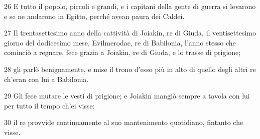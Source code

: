 \par 26 E tutto il popolo, piccoli e grandi, e i capitani della gente di guerra si levarono e se ne andarono in Egitto, perché avean paura dei Caldei.
\par 27 Il trentasettesimo anno della cattività di Joiakin, re di Giuda, il ventisettesimo giorno del dodicesimo mese, Evilmerodac, re di Babilonia, l'anno stesso che cominciò a regnare, fece grazia a Joiakin, re di Giuda, e lo trasse di prigione;
\par 28 gli parlò benignamente, e mise il trono d'esso più in alto di quello degli altri re ch'eran con lui a Babilonia.
\par 29 Gli fece mutare le vesti di prigione; e Joiakin mangiò sempre a tavola con lui per tutto il tempo ch'ei visse:
\par 30 il re provvide continuamente al suo mantenimento quotidiano, fintanto che visse.


